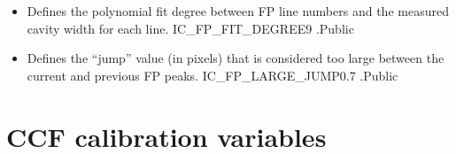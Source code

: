\begin{itemize}
\item {} 
{Defines the polynomial fit degree between FP line numbers and the measured cavity width for each line.}
{IC\_FP\_FIT\_DEGREE}{9}
{\calWAVE}{\constantsfile}{\spirouWAVE.}{Public}

\item {} 
{Defines the ``jump'' value (in pixels) that is considered too large between the current and previous FP peaks.}
{IC\_FP\_LARGE\_JUMP}{0.7}
{\calWAVE}{\constantsfile}{ \spirouWAVE.}{Public}


\end{itemize}


\clearpage
\newpage
\section{CCF calibration variables}
\label{ch:variables:ccf}

